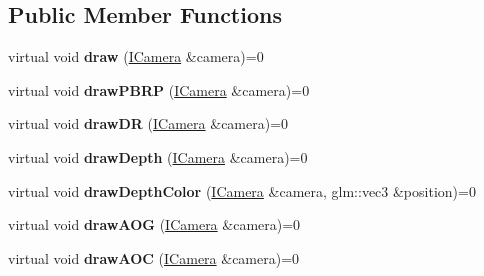 \subsection*{Public Member Functions}
\begin{DoxyCompactItemize}
\item 
virtual void {\bfseries draw} (\hyperlink{classflw_1_1flf_1_1ICamera}{I\+Camera} \&camera)=0\hypertarget{classflw_1_1flf_1_1IDrawable_ad94201dc7ac4f3e94b86b0b8d8d6b597}{}\label{classflw_1_1flf_1_1IDrawable_ad94201dc7ac4f3e94b86b0b8d8d6b597}

\item 
virtual void {\bfseries draw\+P\+B\+RP} (\hyperlink{classflw_1_1flf_1_1ICamera}{I\+Camera} \&camera)=0\hypertarget{classflw_1_1flf_1_1IDrawable_aaadbf5d74624af32ea8b5064502aced0}{}\label{classflw_1_1flf_1_1IDrawable_aaadbf5d74624af32ea8b5064502aced0}

\item 
virtual void {\bfseries draw\+DR} (\hyperlink{classflw_1_1flf_1_1ICamera}{I\+Camera} \&camera)=0\hypertarget{classflw_1_1flf_1_1IDrawable_a38b6d894083451f43f220d96f73a8a65}{}\label{classflw_1_1flf_1_1IDrawable_a38b6d894083451f43f220d96f73a8a65}

\item 
virtual void {\bfseries draw\+Depth} (\hyperlink{classflw_1_1flf_1_1ICamera}{I\+Camera} \&camera)=0\hypertarget{classflw_1_1flf_1_1IDrawable_a38142c33f088087a0c2c7879a73d9c72}{}\label{classflw_1_1flf_1_1IDrawable_a38142c33f088087a0c2c7879a73d9c72}

\item 
virtual void {\bfseries draw\+Depth\+Color} (\hyperlink{classflw_1_1flf_1_1ICamera}{I\+Camera} \&camera, glm\+::vec3 \&position)=0\hypertarget{classflw_1_1flf_1_1IDrawable_ae67b0f617e1e0cc5fb4fb63d7df95a41}{}\label{classflw_1_1flf_1_1IDrawable_ae67b0f617e1e0cc5fb4fb63d7df95a41}

\item 
virtual void {\bfseries draw\+A\+OG} (\hyperlink{classflw_1_1flf_1_1ICamera}{I\+Camera} \&camera)=0\hypertarget{classflw_1_1flf_1_1IDrawable_a3b98b73690d52c7638dad261e7180914}{}\label{classflw_1_1flf_1_1IDrawable_a3b98b73690d52c7638dad261e7180914}

\item 
virtual void {\bfseries draw\+A\+OC} (\hyperlink{classflw_1_1flf_1_1ICamera}{I\+Camera} \&camera)=0\hypertarget{classflw_1_1flf_1_1IDrawable_af5096dd51585f38717f0d250cc839ad0}{}\label{classflw_1_1flf_1_1IDrawable_af5096dd51585f38717f0d250cc839ad0}


\end{DoxyCompactItemize}
